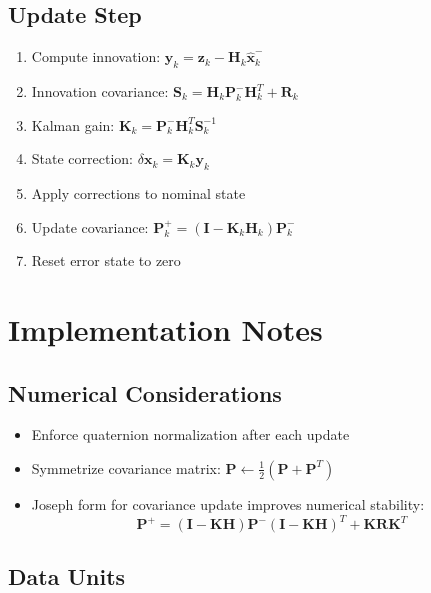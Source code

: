 \documentclass[11pt,a4paper]{article}
\newcommand{\mat}[1]{\mathbf{#1}}
\begin{document}
\subsection{Update Step}

\begin{enumerate}
    \item Compute innovation: $\mat{y}_k = \mat{z}_k - \mat{H}_k \hat{\mat{x}}_k^-$
    \item Innovation covariance: $\mat{S}_k = \mat{H}_k \mat{P}_k^- \mat{H}_k^T + \mat{R}_k$
    \item Kalman gain: $\mat{K}_k = \mat{P}_k^- \mat{H}_k^T \mat{S}_k^{-1}$
    \item State correction: $\delta\mat{x}_k = \mat{K}_k \mat{y}_k$
    \item Apply corrections to nominal state
    \item Update covariance: $\mat{P}_k^+ = (\mat{I} - \mat{K}_k \mat{H}_k)\mat{P}_k^-$
    \item Reset error state to zero
\end{enumerate}

\section{Implementation Notes}

\subsection{Numerical Considerations}

\begin{itemize}
    \item Enforce quaternion normalization after each update
    \item Symmetrize covariance matrix: $\mat{P} \leftarrow \frac{1}{2}(\mat{P} + \mat{P}^T)$
    \item Joseph form for covariance update improves numerical stability:
    \begin{equation}
        \mat{P}^+ = (\mat{I} - \mat{K}\mat{H})\mat{P}^-(\mat{I} - \mat{K}\mat{H})^T + \mat{K}\mat{R}\mat{K}^T
    \end{equation}
\end{itemize}

\subsection{Data Units}
\end{document}
